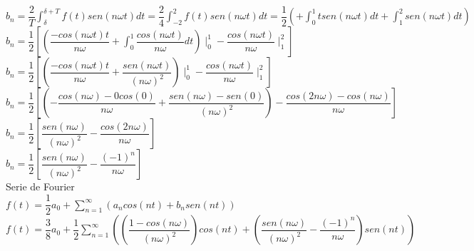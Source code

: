 \documentclass[10pt,a4paper]{article}
\begin{document}
\begin{center}
$\displaystyle{b_n = \dfrac{2}{T} \int_{\delta}^{\delta + T} f(t) sen (n \omega t)dt = \dfrac{2}{4} \int_{-2}^{2} f(t) sen (n \omega t)dt = \dfrac{1}{2} ( + \int_{0}^{1} t sen (n \omega t) dt + \int_{1}^{2} sen (n \omega t) dt)}$\\
$\displaystyle{b_n = \dfrac{1}{2} [(\dfrac{- cos(n \omega t) t}{n \omega} + \int_{0}^{1} \dfrac{cos(n \omega t)}{n \omega} dt)  \mid_{0}^{1}  - \dfrac{cos(n \omega t) }{n \omega} \mid_{1}^{2}]}$\\
$\displaystyle{b_n = \dfrac{1}{2} [(\dfrac{- cos(n \omega t) t}{n \omega} + \dfrac{sen(n \omega t)}{(n \omega)^2})  \mid_{0}^{1}  - \dfrac{cos(n \omega t) }{n \omega} \mid_{1}^{2}]}$\\
$\displaystyle{b_n = \dfrac{1}{2} [(-\dfrac{cos(n \omega ) - 0cos(0)}{n \omega} + \dfrac{sen(n \omega)- sen(0)}{(n \omega)^2}) - \dfrac{cos(2 n \omega)- cos(n \omega) }{n \omega}]}$\\
$\displaystyle{b_n = \dfrac{1}{2} [\dfrac{sen(n \omega)}{(n \omega)^2}  - \dfrac{cos(2 n \omega)}{n \omega}]}$\\
$\displaystyle{b_n = \dfrac{1}{2} [\dfrac{sen(n \omega)}{(n \omega)^2}  - \dfrac{(-1)^n}{n \omega}]}$\\
Serie de Fourier \\
$\displaystyle{f(t) = \dfrac{1}{2} a_0 + \sum_{n = 1}^{\infty} (a_n cos(nt) + b_n sen(nt))}$\\
$\displaystyle{f(t) = \dfrac{3}{8} a_0 + \dfrac{1}{2} \sum_{n = 1}^{\infty}( (\dfrac{1 - cos(n \omega)}{(n \omega)^2}) cos(nt) + (\dfrac{sen(n \omega)}{(n \omega)^2}  - \dfrac{(-1)^n}{n \omega}) sen(nt))}$\\
\end{center}
\end{document}
